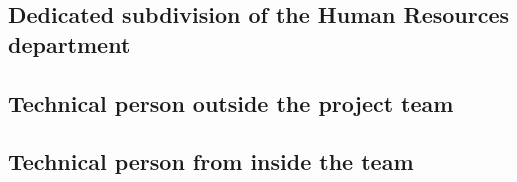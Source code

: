 \newline

\subsection{Dedicated subdivision of the Human Resources department}
\label{subsec:hrdep}

 \newline

\subsection{Technical person outside the project team}
\label{subsec:techout}

 \newline

\subsection{Technical person from inside the team}
\label{subsec:techin}

 \newline

